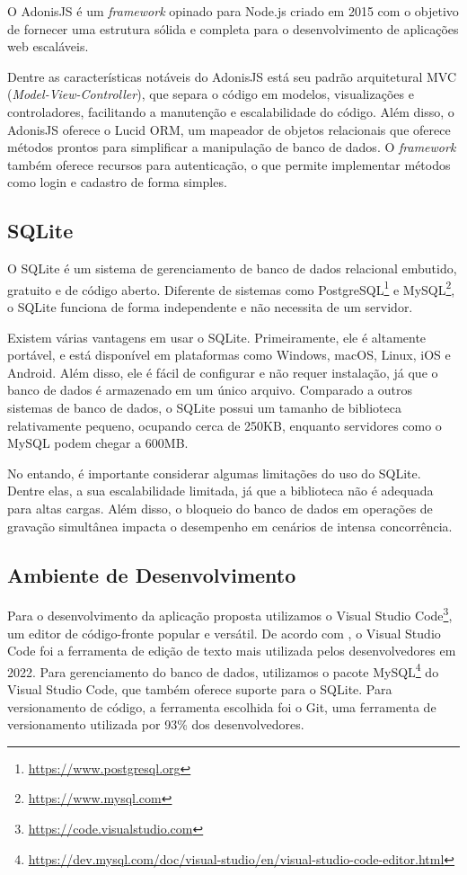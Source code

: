 O AdonisJS é um \textit{framework} opinado para Node.js criado em 2015 com o objetivo de fornecer uma estrutura sólida e completa para o desenvolvimento de aplicações web escaláveis.

Dentre as características notáveis do AdonisJS está seu padrão arquitetural MVC (\textit{Model-View-Controller}), que separa o código em modelos, visualizações e controladores, facilitando a manutenção e escalabilidade do código. Além disso, o AdonisJS oferece o Lucid ORM, um mapeador de objetos relacionais que oferece métodos prontos para simplificar a manipulação de banco de dados. O \textit{framework} também oferece recursos para autenticação, o que permite implementar métodos como login e cadastro de forma simples.

\subsection{SQLite}

O SQLite é um sistema de gerenciamento de banco de dados relacional embutido, gratuito e de código aberto. Diferente de sistemas como PostgreSQL\footnote{\url{https://www.postgresql.org}} e MySQL\footnote{\url{https://www.mysql.com}}, o SQLite funciona de forma independente e não necessita de um servidor.

Existem várias vantagens em usar o SQLite. Primeiramente, ele é altamente portável, e está disponível em plataformas como Windows, macOS, Linux, iOS e Android. Além disso, ele é fácil de configurar e não requer instalação, já que o banco de dados é armazenado em um único arquivo. Comparado a outros sistemas de banco de dados, o SQLite possui um tamanho de biblioteca relativamente pequeno, ocupando cerca de 250KB, enquanto servidores como o MySQL podem chegar a 600MB. \cite{estrella_2023}

No entando, é importante considerar algumas limitações do uso do SQLite. Dentre elas, a sua escalabilidade limitada, já que a biblioteca não é adequada para altas cargas. Além disso, o bloqueio do banco de dados em operações de gravação simultânea impacta o desempenho em cenários de intensa concorrência.

\subsection{Ambiente de Desenvolvimento}

Para o desenvolvimento da aplicação proposta utilizamos o Visual Studio Code\footnote{\url{https://code.visualstudio.com}}, um editor de código-fronte popular e versátil. De acordo com , o Visual Studio Code foi a ferramenta de edição de texto mais utilizada pelos desenvolvedores em 2022. Para gerenciamento do banco de dados, utilizamos o pacote MySQL\footnote{\url{https://dev.mysql.com/doc/visual-studio/en/visual-studio-code-editor.html}} do Visual Studio Code, que também oferece suporte para o SQLite. Para versionamento de código, a ferramenta escolhida foi o Git, uma ferramenta de versionamento utilizada por 93\% dos desenvolvedores. \cite{flow_2022}

